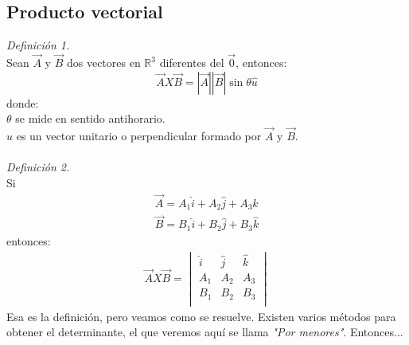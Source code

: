 \documentclass[12pt,openany]{book}
\begin{document}
	    \subsection{Producto vectorial}
	    \noindent\textsl{Definici\'on 1.}\\
	    Sean $\vec{A}$ y $\vec{B}$ dos vectores en $\mathbb{R}^{3}$ diferentes
	    del $\vec{0}$, entonces:
	    $$
	    	\vec{A}X\vec{B}=|\vec{A}||\vec{B}|\sin\theta\hat{u}
	    $$
	    donde:\\
	    $\theta$ se mide en sentido antihorario.\\
	    $\hat{u}$ es un vector unitario o perpendicular formado por $\vec{A}$ y $\vec{B}$.\\ \\
	    \noindent\textsl{Definici\'on 2.}\\
	    Si 
	    \begin{equation*}
	    	\begin{split}
	    		\vec{A}=A_{1}\hat{i}+A_{2}\hat{j}+A_{3}\hat{k}\\
	    		\vec{B}=B_{1}\hat{i}+B_{2}\hat{j}+B_{3}\hat{k}		
	    	\end{split}
	    \end{equation*}
	    entonces:
	    \begin{equation*}
	    	\begin{split}
	    		\vec{A}X\vec{B}=\begin{vmatrix}
	    							\hat{i} & \hat{j} & \hat{k} \\
	    							 A_{1}  &  A_{2}  & A_{3}   \\
	    							 B_{1}  &  B_{2}  & B_{3}   \\
 	    						\end{vmatrix}
	    	\end{split}
	    \end{equation*}
	    Esa es la definici\'on, pero veamos como se resuelve. Existen varios m\'etodos para obtener 
	    el determinante, el que veremos aqu\'i se llama \textsl{"Por menores"}. Entonces...
\end{document}
